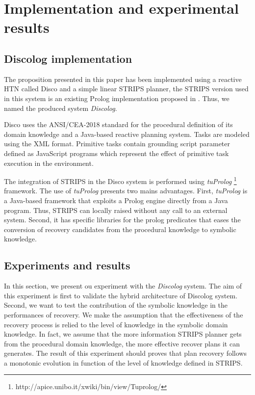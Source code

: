 \documentclass[conference]{IEEEtran}
\begin{document}
	\section{Implementation and experimental results}
	\subsection{Discolog implementation}
	
	\par The proposition presented in this paper has been implemented using a reactive HTN called  Disco \cite{rich2009building} and a simple linear STRIPS planner, the STRIPS version used in this system is an existing  Prolog implementation proposed in \cite{poole1998computational}. Thus, we named the produced system \emph{Discolog}. 
	\par  Disco uses the ANSI/CEA-2018 standard for the procedural definition of its domain knowledge and a Java-based reactive planning system. Tasks are modeled using the XML format. Primitive tasks contain grounding script parameter defined	as JavaScript programs which represent the effect of  primitive task execution in the environment. 
	\par  The integration of STRIPS in the Disco system is performed using  \emph{tuProlog} \footnote{http://apice.unibo.it/xwiki/bin/view/Tuprolog/} framework. The use of  \emph{tuProlog} presents two mains advantages. First, \emph{tuProlog} is a Java-based framework that exploits a Prolog engine directly from a Java program. Thus, STRIPS can locally raised without any call to an external system. Second, it has specific libraries for the prolog predicates that eases the conversion of recovery candidates from the procedural knowledge to symbolic knowledge. 
	\subsection{Experiments and results}
	\par  In this section, we present ou experiment with the \emph{Discolog} system. The aim of this  experiment is first to validate the hybrid architecture of Discolog system. Second, we want to test the contribution of the symbolic knowledge in the performances of recovery. We make the assumption that the effectiveness of the recovery process is relied to the level of knowledge in the symbolic domain knowledge. In fact, we assume that the more information STRIPS planner gets from the procedural domain knowledge, the more effective recover plans it can generates. The result of this experiment should proves that plan recovery follows a monotonic evolution in function of the level of knowledge defined in STRIPS.
\end{document}
